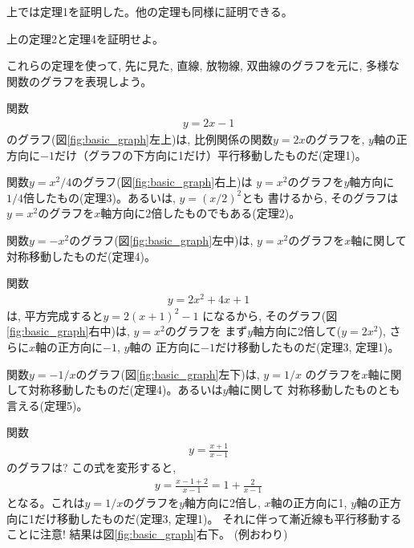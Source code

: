 上では定理1を証明した。他の定理も同様に証明できる。

\begin{q}\label{q:func_trans1} 上の定理2と定理4を証明せよ。\end{q}
\mv

これらの定理を使って, 先に見た, 直線, 放物線, 双曲線のグラフを元に, 
多様な関数のグラフを表現しよう。
\begin{exmpl}関数
\begin{eqnarray}y=2x-1\label{eq:func_exm_line2x_1}\end{eqnarray}
のグラフ(図\ref{fig:basic_graph}左上)は, 比例関係の関数$y=2x$のグラフを, 
$y$軸の正方向に$-1$だけ（グラフの下方向に1だけ）平行移動したものだ(定理1)。
\end{exmpl}

\begin{exmpl}関数$y=x^2/4$のグラフ(図\ref{fig:basic_graph}右上)は
$y=x^2$のグラフを$y$軸方向に$1/4$倍したもの(定理3)。あるいは, $y=(x/2)^2$とも
書けるから, そのグラフは$y=x^2$のグラフを$x$軸方向に$2$倍したものでもある(定理2)。
\end{exmpl}

\begin{exmpl}関数$y=-x^2$のグラフ(図\ref{fig:basic_graph}左中)は, 
$y=x^2$のグラフを$x$軸に関して対称移動したものだ(定理4)。
\end{exmpl}

\begin{exmpl}関数
\begin{eqnarray}y=2x^2+4x+1\end{eqnarray}
は, 平方完成すると$y=2(x+1)^2-1$
になるから, そのグラフ(図\ref{fig:basic_graph}右中)は, $y=x^2$のグラフを
まず$y$軸方向に2倍して($y=2x^2$), さらに$x$軸の正方向に$-1$, $y$軸の
正方向に$-1$だけ移動したものだ(定理3, 定理1)。
\end{exmpl}

\begin{exmpl}関数$y=-1/x$のグラフ(図\ref{fig:basic_graph}左下)は, $y=1/x$
のグラフを$x$軸に関して対称移動したものだ(定理4)。あるいは$y$軸に関して
対称移動したものとも言える(定理5)。
\end{exmpl}

\begin{exmpl}関数
\begin{eqnarray}y=\frac{x+1}{x-1}\end{eqnarray}
のグラフは? この式を変形すると, 
\begin{eqnarray}y=\frac{x-1+2}{x-1}=1+\frac{2}{x-1}\end{eqnarray}
となる。これは$y=1/x$のグラフを$y$軸方向に2倍し, 
$x$軸の正方向に1, $y$軸の正方向に1だけ移動したものだ(定理3, 定理1)。
それに伴って漸近線も平行移動することに注意! 結果は図\ref{fig:basic_graph}右下。 (例おわり)
\end{exmpl}\mv

